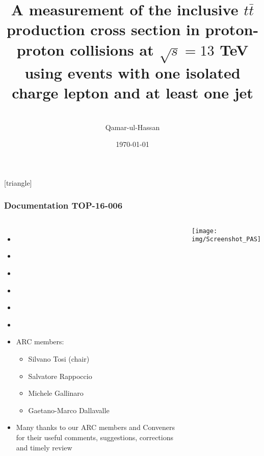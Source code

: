 \documentclass{beamer}
\title[IIU Seminar]{A measurement of the inclusive $t\bar{t}$ production cross section in proton-proton collisions at $\sqrt{s}=13$ TeV using events with one isolated charge lepton and at least one jet} %
\author[Qamar-ul-Hassan]{\\
\vspace{5 mm}
Qamar-ul-Hassan}%
\institute[IIU-Islamabad] %
{
International Islamic University, Islamabad%
\medskip
}
\date{\today} %
\begin{document}
\begin{frame}
\titlepage %
\end{frame}
[triangle]
\newcommand{\tikzmark}[1]{\tikz[overlay,remember picture] \node (#1) {};}
\begin{frame}
\frametitle{Documentation TOP-16-006}
\begin{columns}
\begin{itemize}
\item \href {http://cms.cern.ch/iCMS/analysisadmin/cadilines?line=TOP-16-006}{}
\item \href {https://twiki.cern.ch/twiki/bin/viewauth/CMS/CadiTop16006}{}
\item \href {https://hypernews.cern.ch/HyperNews/CMS/get/TOP-16-006}{}
\item \href {http://cms.cern.ch/iCMS/jsp/db\_notes/noteInfo.jsp?cmsnoteid=CMS\%20AN-2015/233}{}
\item \href {https://indico.cern.ch/event/496134/contributions/1174762/attachments/1227976/1805326/QaMaR\_Feb05.pdf}{}
\item \href {https://indico.cern.ch/event/546872/contributions/2228814/attachments/1304075/1955661/approval.pdf}{}
\item ARC members: 
\begin{itemize}
\scriptsize
\item Silvano Tosi (chair)
\item Salvatore Rappoccio
\item Michele Gallinaro
\item Gaetano-Marco Dallavalle
\end{itemize}
\scriptsize
\item Many thanks to our ARC members and Conveners for their useful comments, suggestions, corrections and timely review
\end{itemize}
 \texttt{[image: img/Screenshot\_PAS]}
\end{columns}
\end{frame}
\end{document}
